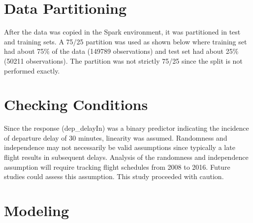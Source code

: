 \documentclass[12pt,twoside]{amherstthesis}
\begin{document}
  \section{Data Partitioning}\label{data-partitioning}
  
  After the data was copied in the Spark environment, it was partitioned
  in test and training sets. A 75/25 partition was used as shown below
  where training set had about 75\% of the data (149789 observations) and
  test set had about 25\% (50211 observations). The partition was not
  strictly 75/25 since the split is not performed exactly.
  
  \begin{Shaded}
  \end{Shaded}
  
  \section{Checking Conditions}\label{checking-conditions}
  
  Since the response (dep\_delayIn) was a binary predictor indicating the
  incidence of departure delay of 30 minutes, linearity was assumed.
  Randomness and independence may not necessarily be valid assumptions
  since typically a late flight results in subsequent delays. Analysis of
  the randomness and independence assumption will require tracking flight
  schedules from 2008 to 2016. Future studies could assess this
  assumption. This study proceeded with caution.
  
  \section{Modeling}\label{modeling}
  
\end{document}
